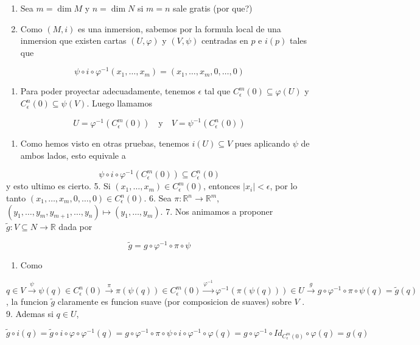 \begin{bookproof}{}
\begin{enumerate}
\item Sea $m=\dim M$ y $n=\dim N$ si $m=n$ sale gratis (por que?)
\item Como $(M,i)$ es una inmersion, sabemos por la formula local de una inmersion que existen cartas $(U,\varphi)$ y $(V,\psi)$ centradas en $p$ e $i(p)$ tales que
\end{enumerate}
\[
\psi\circ i\circ\varphi^{-1}(x_1,\ldots,x_m)=(x_1,\ldots,x_m,0,\ldots,0)
\]
\begin{enumerate}[start=3]
\item Para poder proyectar adecuadamente, tenemos $\epsilon$ tal que $C_\epsilon^m(0)\subseteq\varphi(U)$ y $C_\epsilon^n(0)\subseteq\psi(V)$. Luego llamamos
\end{enumerate}
\[
U=\varphi^{-1}(C_\epsilon^m(0))\quad \text{y}\quad V=\psi^{-1}(C_\epsilon^n(0))
\]
\begin{enumerate}[start=4]
\item Como hemos visto en otras pruebas, tenemos $i(U)\subseteq V$ pues aplicando $\psi$ de ambos lados, esto equivale a
\end{enumerate}
\[
\psi\circ i\circ\varphi^{-1}(C_\epsilon^m(0))\subseteq C_\epsilon^n(0)
\]
y esto ultimo es cierto. 5. Si $(x_1,\ldots,x_m)\in C_\epsilon^m(0)$, entonces $|x_i|<\epsilon$, por lo tanto $(x_1,\ldots,x_m,0,\ldots,0)\in C_\epsilon^n(0)$. 6. Sea $\pi:\mathbb R^n\to\mathbb R^m$, $(y_1,\ldots,y_m,y_{m+1},\ldots,y_n)\mapsto(y_1,\ldots,y_m)$. 7. Nos animamos a proponer $\widetilde g:V\subseteq N\to\mathbb R$ dada por

\[
\widetilde g=g\circ\varphi^{-1}\circ\pi\circ\psi
\]
\begin{enumerate}[start=8]
\item Como
\end{enumerate}
\[
q\in V\xrightarrow{\psi}\psi(q)\in C_{\epsilon}^{n}(0) \xrightarrow{\pi}\pi(\psi(q))\in C_{\epsilon}^{m}(0) \xrightarrow{\varphi^{-1}}\varphi^{-1}(\pi(\psi(q)))\in U\xrightarrow{g}g\circ\varphi^{-1}\circ\pi\circ\psi(q)=\tilde{g}(q)
\]
, la funcion $\widetilde g$ claramente es funcion suave (por composicion de suaves) sobre $V$ . 9. Ademas si $q\in U$,

\[
\widetilde g\circ i(q)=\tilde g\circ i\circ \varphi\circ\varphi ^{-1}(q)=g\circ\varphi^{-1}\circ\pi\circ\psi\circ i\circ\varphi ^{-1}\circ\varphi(q)=g\circ\varphi ^{-1}\circ Id_{C_{\epsilon}^{m} (0)}\circ\varphi(q)=g(q)
\]
\bookqed
\end{bookproof}
